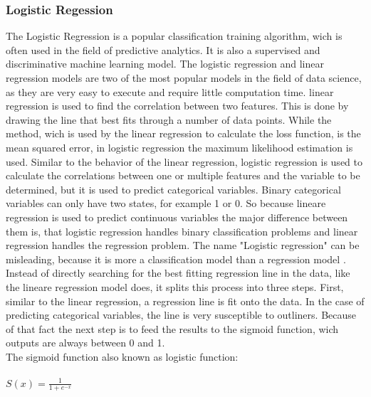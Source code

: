 \documentclass[../masterarbeit.tex]{subfiles}
\begin{document}
\subsubsection{Logistic Regession}

The Logistic Regression is a popular classification training algorithm, wich is often used in the field of predictive analytics. It is also a supervised and discriminative machine learning model. \autocite[]{ibm-logistic-regression:2022} 
The logistic regression and linear regression models are two of the most popular models in the field of data science, as they are very easy to execute and require little computation time. linear regression is used to find the correlation between two features. This is done by drawing the line that best fits through a number of data points. While the method, wich is used by the linear regression to calculate the loss function, is the mean squared error, in logistic regression the maximum likelihood estimation is used. Similar to the behavior of the linear regression, logistic regression is used to calculate the correlations between one or multiple features and the variable to be determined, but it is used to predict categorical variables.  Binary categorical variables can only have two states, for example 1 or 0. So because lineare regression is used to predict continuous variables the major difference between them is, that logistic regression handles binary classification problems and linear regression handles the regression problem. \autocite[]{BELYADI2021169} \textcite[]{ibm-logistic-regression:2022} \textcite[]{Sourav:2020} The name "Logistic regression" can be misleading, because it is more a classification model than a regression model \textcite[]{SUBASI202091}. Instead of directly searching for the best fitting regression line in the data, like the lineare regression model does, it splits this process into three steps. First, similar to the linear regression, a regression line is fit onto the data. In the case of predicting categorical variables, the line is very susceptible to outliners. Because of that fact the next step is to feed the results to the sigmoid function, wich outputs are always between 0 and 1. \autocite[]{ibm-logistic-regression:2022} \textcite[]{Sourav:2020} \textcite[]{BELYADI2021169}\\
The sigmoid function also known as logistic function: \\~\\
\( S(x) = \frac{1}{1 + e^{-x}}\) \hfill \textcite[]{Sourav:2020} \textcite[]{BELYADI2021169} \\~\\
\end{document}
